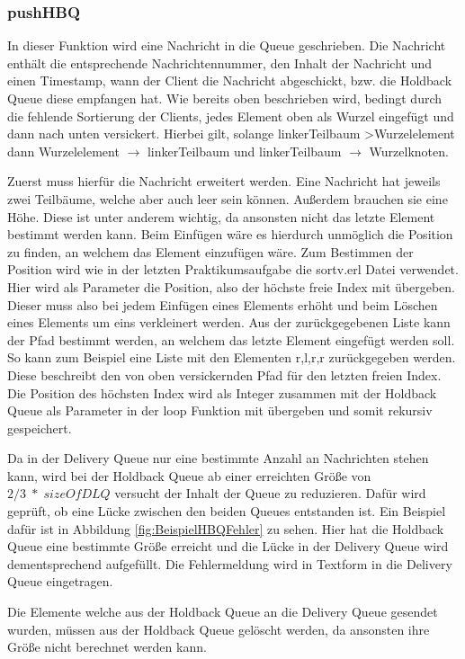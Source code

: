 \subsubsection{pushHBQ}

In dieser Funktion wird eine Nachricht in die Queue geschrieben. Die Nachricht enthält die entsprechende Nachrichtennummer, den Inhalt der Nachricht und einen Timestamp, wann der Client die Nachricht abgeschickt, bzw. die Holdback Queue diese empfangen hat. Wie bereits oben beschrieben wird, bedingt durch die fehlende Sortierung der Clients, jedes Element oben als Wurzel eingefügt und dann nach unten versickert. Hierbei gilt, solange linkerTeilbaum \textgreater Wurzelelement dann Wurzelelement $\rightarrow$ linkerTeilbaum und linkerTeilbaum $\rightarrow$ Wurzelknoten.

Zuerst muss hierfür die Nachricht erweitert werden. Eine Nachricht hat jeweils zwei Teilbäume, welche aber auch leer sein können. Außerdem brauchen sie eine Höhe. Diese ist unter anderem wichtig, da ansonsten nicht das letzte Element bestimmt werden kann. Beim Einfügen wäre es hierdurch unmöglich die Position zu finden, an welchem das Element einzufügen wäre. 
Zum Bestimmen der Position wird wie in der letzten Praktikumsaufgabe die sortv.erl Datei verwendet. Hier wird als Parameter die Position, also der höchste freie Index mit übergeben. Dieser muss also bei jedem Einfügen eines Elements erhöht und beim Löschen eines Elements um eins verkleinert werden. 
Aus der zurückgegebenen Liste kann der Pfad bestimmt werden, an welchem das letzte Element eingefügt werden soll. So kann zum Beispiel eine Liste mit den Elementen {r,l,r,r} zurückgegeben werden. Diese beschreibt den von oben versickernden Pfad für den letzten freien Index.
Die Position des höchsten Index wird als Integer zusammen mit der Holdback Queue als Parameter in der loop Funktion mit übergeben und somit rekursiv gespeichert. 

Da in der Delivery Queue nur eine bestimmte Anzahl an Nachrichten stehen kann, wird bei der Holdback Queue ab einer erreichten Größe von $2/3\;*\;sizeOfDLQ$ versucht der Inhalt der Queue zu reduzieren. Dafür wird geprüft, ob eine Lücke zwischen den beiden Queues entstanden ist. Ein Beispiel dafür ist in Abbildung \ref{fig:BeispielHBQFehler} zu sehen. Hier hat die Holdback Queue eine bestimmte Größe erreicht und die Lücke in der Delivery Queue wird dementsprechend aufgefüllt. Die Fehlermeldung wird in Textform in die Delivery Queue eingetragen.

Die Elemente welche aus der Holdback Queue an die Delivery Queue gesendet wurden, müssen aus der Holdback Queue gelöscht werden, da ansonsten ihre Größe nicht berechnet werden kann. 

